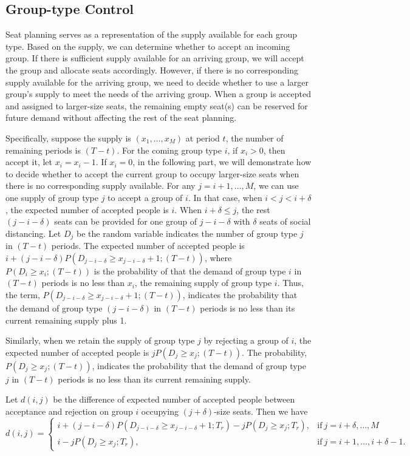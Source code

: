 \subsection{Group-type Control}\label{nested_policy}
Seat planning serves as a representation of the supply available for each group type. Based on the supply, we can determine whether to accept an incoming group. If there is sufficient supply available for an arriving group, we will accept the group and allocate seats accordingly. However, if there is no corresponding supply available for the arriving group, we need to decide whether to use a larger group's supply to meet the needs of the arriving group. When a group is accepted and assigned to larger-size seats, the remaining empty seat(s) can be reserved for future demand without affecting the rest of the seat planning.

Specifically, suppose the supply is $(x_1, \ldots, x_M)$ at period $t$, the number of remaining periods is $(T-t)$. For the coming group type $i$, if $x_i > 0$, then accept it, let $x_i = x_i -1$.
If $x_i = 0$, in the following part, we will demonstrate how to decide whether to accept the current group to occupy larger-size seats when there is no corresponding supply available. For any $j=i+1, \ldots, M$, we can use one supply of group type $j$ to accept a group of $i$. In that case, when $i <j < i+\delta$, the expected number of accepted people is $i$. When $i+\delta \leq j$, the rest $(j-i-\delta)$ seats can be provided for one group of $j-i-\delta$ with $\delta$ seats of social distancing. Let $D_j$ be the random variable indicates the number of group type $j$ in $(T-t)$ periods. The expected number of accepted people is $i + (j-i-\delta)P(D_{j-i-\delta} \geq x_{j-i-\delta}+1; (T-t))$, where $P(D_i \geq x_i; (T-t))$ is the probability of that the demand of group type $i$ in $(T-t)$ periods is no less than $x_i$, the remaining supply of group type $i$. Thus, the term, $P(D_{j-i-\delta} \geq x_{j-i-\delta}+1; (T-t))$, indicates the probability that the demand of group type $(j-i-\delta)$ in $(T-t)$ periods is no less than its current remaining supply plus 1. 

Similarly, when we retain the supply of group type $j$ by rejecting a group of $i$, the expected number of accepted people is $j P(D_{j} \geq x_{j}; (T-t))$. The probability, $P(D_{j} \geq x_{j}; (T-t))$, indicates the probability that the demand of group type $j$ in $(T-t)$ periods is no less than its current remaining supply.

Let $d(i,j)$ be the difference of expected number of accepted people between acceptance and rejection on group $i$ occupying $(j+\delta)$-size seats. Then we have
\begin{equation*}
	d(i,j) = \begin{cases}
    i + (j-i-\delta)P(D_{j-i-\delta} \geq x_{j-i-\delta}+1; T_r) - j P(D_{j} \geq x_{j}; T_r), &\text{if}~ j = i+\delta, \ldots, M \\
    i - j P(D_{j} \geq x_{j}; T_r), &\text{if}~ j = i+1, \ldots, i+\delta-1.
		\end{cases}
\end{equation*}


